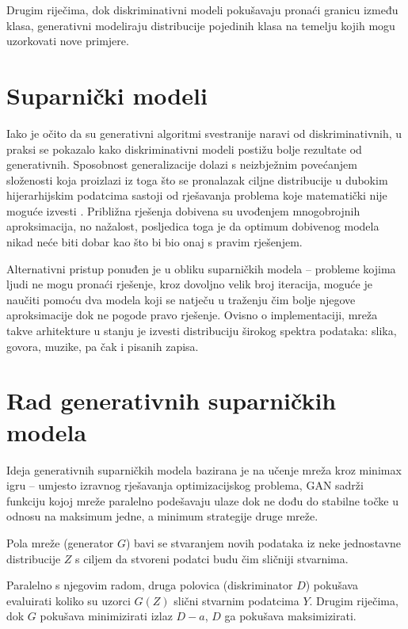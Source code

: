 \documentclass[lmodern, utf8, seminar]{fer}
\begin{document}
Drugim riječima, dok diskriminativni modeli pokušavaju pronaći granicu između klasa, generativni modeliraju distribucije pojedinih klasa na temelju kojih mogu uzorkovati nove primjere.
\newline

\newpage
\section{Suparnički modeli}
Iako je očito da su generativni algoritmi svestranije naravi od diskriminativnih, u praksi se pokazalo kako diskriminativni modeli postižu bolje rezultate od generativnih. Sposobnost generalizacije dolazi s neizbježnim povećanjem složenosti koja proizlazi iz toga što se pronalazak ciljne distribucije u dubokim hijerarhijskim podatcima sastoji od rješavanja problema koje matematički nije moguće izvesti \cite{goodfellow2014generative}. Približna rješenja dobivena su uvođenjem mnogobrojnih aproksimacija, no nažalost, posljedica toga je da optimum dobivenog modela nikad neće biti dobar kao što bi bio onaj s pravim rješenjem.
\newline

Alternativni pristup ponuđen je u obliku suparničkih modela -- probleme kojima ljudi ne mogu pronaći rješenje, kroz dovoljno velik broj iteracija, moguće je naučiti pomoću dva modela koji se natječu u traženju čim bolje njegove aproksimacije dok ne pogode pravo rješenje. Ovisno o implementaciji, mreža takve arhitekture u stanju je izvesti distribuciju širokog spektra podataka: slika, govora, muzike, pa čak i pisanih zapisa.
\newline



\section{Rad generativnih suparničkih modela}
Ideja generativnih suparničkih modela bazirana je na učenje mreža kroz minimax igru -- umjesto izravnog rješavanja optimizacijskog problema, GAN sadrži funkciju kojoj mreže paralelno podešavaju ulaze dok ne dođu do stabilne točke u odnosu na maksimum jedne, a minimum strategije druge mreže. 
\newline

Pola mreže (generator $G$) bavi se stvaranjem novih podataka iz neke jednostavne distribucije $Z$ s ciljem da stvoreni podatci budu čim sličniji stvarnima. 

Paralelno s njegovim radom, druga polovica (diskriminator $D$) pokušava evaluirati koliko su uzorci $G(Z)$ slični stvarnim podatcima $Y$. Drugim riječima, dok $G$ pokušava minimizirati izlaz $D-a$, $D$ ga pokušava maksimizirati.
\newline
\newpage
\end{document}
